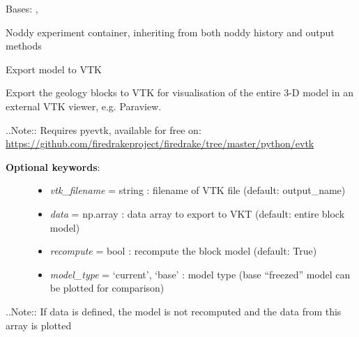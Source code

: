 \documentclass[a4paper,10pt,english]{sphinxmanual}
\begin{document}
\begin{fulllineitems}
\label{pynoddy:pynoddy.experiment.Experiment}
Bases: {\hyperref[pynoddy:pynoddy.history.NoddyHistory]{\emph{}}}, {\hyperref[pynoddy:pynoddy.output.NoddyOutput]{\emph{}}}

Noddy experiment container, inheriting from both noddy history and output methods

\begin{fulllineitems}
\label{pynoddy:pynoddy.experiment.Experiment.export_to_vtk}
Export model to VTK

Export the geology blocks to VTK for visualisation of the entire 3-D model in an
external VTK viewer, e.g. Paraview.

..Note:: Requires pyevtk, available for free on: \href{https://github.com/firedrakeproject/firedrake/tree/master/python/evtk}{https://github.com/firedrakeproject/firedrake/tree/master/python/evtk}
\begin{description}
\item[{\textbf{Optional keywords}:}] \leavevmode\begin{itemize}
\item {} 
\emph{vtk\_filename} = string : filename of VTK file (default: output\_name)

\item {} 
\emph{data} = np.array : data array to export to VKT (default: entire block model)

\item {} 
\emph{recompute} = bool : recompute the block model (default: True)

\item {} 
\emph{model\_type} = `current', `base' : model type (base ``freezed'' model can be plotted for comparison)

\end{itemize}

\end{description}

..Note:: If data is defined, the model is not recomputed and the data from this array is plotted

\end{fulllineitems}


\end{fulllineitems}
\end{document}
